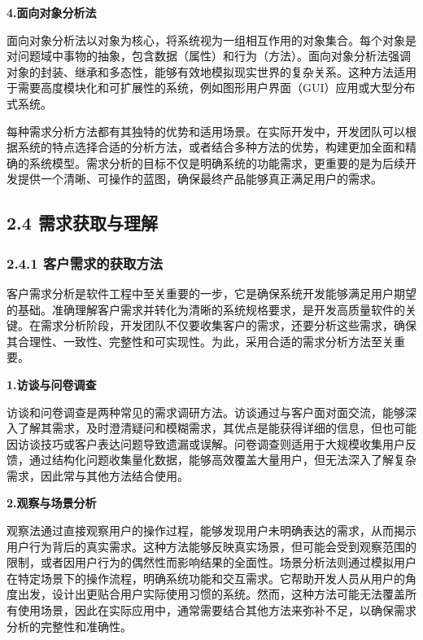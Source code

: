 \textbf{4.面向对象分析法}

面向对象分析法以对象为核心，将系统视为一组相互作用的对象集合。每个对象是对问题域中事物的抽象，包含数据（属性）和行为（方法）。面向对象分析法强调对象的封装、继承和多态性，能够有效地模拟现实世界的复杂关系。这种方法适用于需要高度模块化和可扩展性的系统，例如图形用户界面（GUI）应用或大型分布式系统。

每种需求分析方法都有其独特的优势和适用场景。在实际开发中，开发团队可以根据系统的特点选择合适的分析方法，或者结合多种方法的优势，构建更加全面和精确的系统模型。需求分析的目标不仅是明确系统的功能需求，更重要的是为后续开发提供一个清晰、可操作的蓝图，确保最终产品能够真正满足用户的需求。

\subsection{2.4 需求获取与理解}\label{ux9700ux6c42ux83b7ux53d6ux4e0eux7406ux89e3}

\subsubsection{2.4.1 客户需求的获取方法}\label{ux5ba2ux6237ux9700ux6c42ux7684ux83b7ux53d6ux65b9ux6cd5}

客户需求分析是软件工程中至关重要的一步，它是确保系统开发能够满足用户期望的基础。准确理解客户需求并转化为清晰的系统规格要求，是开发高质量软件的关键。在需求分析阶段，开发团队不仅要收集客户的需求，还要分析这些需求，确保其合理性、一致性、完整性和可实现性。为此，采用合适的需求分析方法至关重要。

\textbf{1.访谈与问卷调查}

访谈和问卷调查是两种常见的需求调研方法。访谈通过与客户面对面交流，能够深入了解其需求，及时澄清疑问和模糊需求，其优点是能获得详细的信息，但也可能因访谈技巧或客户表达问题导致遗漏或误解。问卷调查则适用于大规模收集用户反馈，通过结构化问题收集量化数据，能够高效覆盖大量用户，但无法深入了解复杂需求，因此常与其他方法结合使用。

\textbf{2.观察与场景分析}

观察法通过直接观察用户的操作过程，能够发现用户未明确表达的需求，从而揭示用户行为背后的真实需求。这种方法能够反映真实场景，但可能会受到观察范围的限制，或者因用户行为的偶然性而影响结果的全面性。场景分析法则通过模拟用户在特定场景下的操作流程，明确系统功能和交互需求。它帮助开发人员从用户的角度出发，设计出更贴合用户实际使用习惯的系统。然而，这种方法可能无法覆盖所有使用场景，因此在实际应用中，通常需要结合其他方法来弥补不足，以确保需求分析的完整性和准确性。

